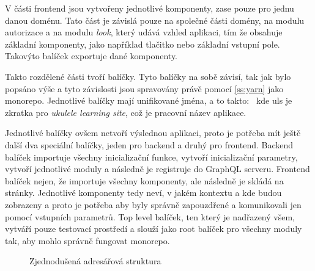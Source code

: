 V části frontend jsou vytvořeny jednotlivé komponenty, zase pouze pro jednu danou doménu. Tato část je závislá pouze na společné části domény, na modulu autorizace a na modulu \emph{look}, který udává vzhled aplikaci, tím že obsahuje základní komponenty, jako například tlačitko nebo základní vstupní pole. Takovýto balíček exportuje dané komponenty.

Takto rozdělené části tvoří balíčky. Tyto balíčky na sobě závisí, tak jak bylo popsáno výše a tyto závislosti jsou spravovány právě pomocí \ref{ss:yarn} jako monorepo. Jednotlivé balíčky mají unifikované jména, a to takto:~ kde uls je zkratka pro \emph{ukulele learning site}, což je pracovní název aplikace.

Jednotlivé balíčky ovšem netvoří výslednou aplikaci, proto je potřeba mít ještě další dva speciální balíčky, jeden pro backend a druhý pro frontend. Backend balíček importuje všechny inicializační funkce, vytvoří inicializační parametry, vytvoří jednotlivé moduly a následně je registruje do GraphQL serveru. Frontend balíček nejen, že importuje všechny komponenty, ale následně je skládá na stránky. Jednotlivé komponenty tedy neví, v jakém kontextu a kde budou zobrazeny a proto je potřeba aby byly správně zapouzdřené a komunikovali jen pomocí vstupních parametrů. Top level balíček, ten který je nadřazený všem, vytváří pouze testovací prostředí a slouží jako root balíček pro všechny moduly tak, aby mohlo správně fungovat monorepo.


\begin{figure}
    \caption{Zjednodušená adresářová struktura}
    \label{fig:modules}
\end{figure}

